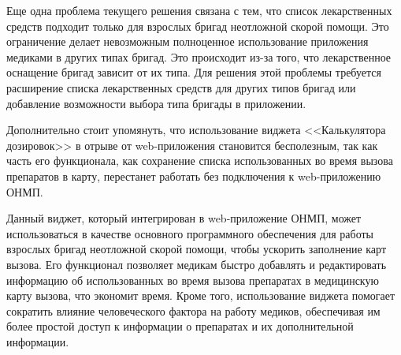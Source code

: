 Еще одна проблема текущего решения связана с тем, что список лекарственных средств подходит только для взрослых бригад неотложной скорой помощи. Это ограничение делает невозможным полноценное использование приложения медиками в других типах бригад. Это происходит из-за того, что лекарственное оснащение бригад зависит от их типа. Для решения этой проблемы требуется расширение списка лекарственных средств для других типов бригад или добавление возможности выбора типа бригады в приложении.

Дополнительно стоит упомянуть, что использование виджета <<Калькулятора дозировок>> в отрыве от web-приложения становится бесполезным, так как часть его функционала, как сохранение списка использованных во время вызова препаратов в карту, перестанет работать без подключения к web-приложению ОНМП.

Данный виджет, который интегрирован в web-приложение ОНМП, может использоваться в качестве основного программного обеспечения для работы взрослых бригад неотложной скорой помощи, чтобы ускорить заполнение карт вызова. Его функционал позволяет медикам быстро добавлять и редактировать информацию об использованных во время вызова препаратах в медицинскую карту вызова, что экономит время. Кроме того, использование виджета помогает сократить влияние человеческого фактора на работу медиков, обеспечивая им более простой доступ к информации о препаратах и их дополнительной информации.
